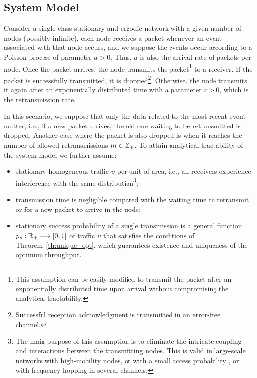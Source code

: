 \subsection{System Model}

Consider a single class stationary and ergodic network with a given number of nodes (possibly infinite), each node receives a packet whenever an event associated with that node occurs, and we suppose the events occur according to a Poisson process of parameter $a > 0$.
%
Thus, $a$ is also the arrival rate of packets per node. Once the packet arrives, the node transmits the packet\footnote{{This assumption can be easily modified to transmit the packet after an exponentially distributed time upon arrival without compromising the analytical tractability.}} to a receiver. If the packet is successfully transmitted, it is dropped\footnote{Successful reception acknowledgment is transmitted in an error-free channel.}.
%
Otherwise, the node transmits it again after an exponentially distributed time with a parameter $r > 0$, which is the retransmission rate.

In this scenario, we suppose that only the data related to the most recent event matter, i.e.,
if a new packet arrives, the old one waiting to be retransmitted is dropped. Another case where the packet is also dropped is when it reaches the number of allowed retransmissions $m \in {\mathbb Z}_+$.
%
To attain analytical tractability of the system model we further assume:
%
\begin{itemize}[itemsep=3pt,parsep=3pt,topsep=3pt,partopsep=3pt]
    \item stationary homogeneous traffic $\upsilon$ per unit of area, i.e., all receivers experience interference with the same distribution\footnote{
     {The main purpose of this assumption is to eliminate the intricate coupling and interactions between the transmitting nodes.}
    This is valid in large-scale networks with high-mobility nodes, or with a small access probability \cite{haenggi2013diversity}, or with frequency hopping in several channels.};
    \item transmission time is negligible compared with the waiting time to retransmit or for a new packet to arrive in the node;
    \item stationary success probability of a single transmission is a general function $p_s:{\mathbb R}_+\longrightarrow[0,1]$ of traffic $\upsilon$ that satisfies the conditions of Theorem~\ref{th:unique_opt}, which guarantees existence and uniqueness of the optimum throughput.
\end{itemize}

